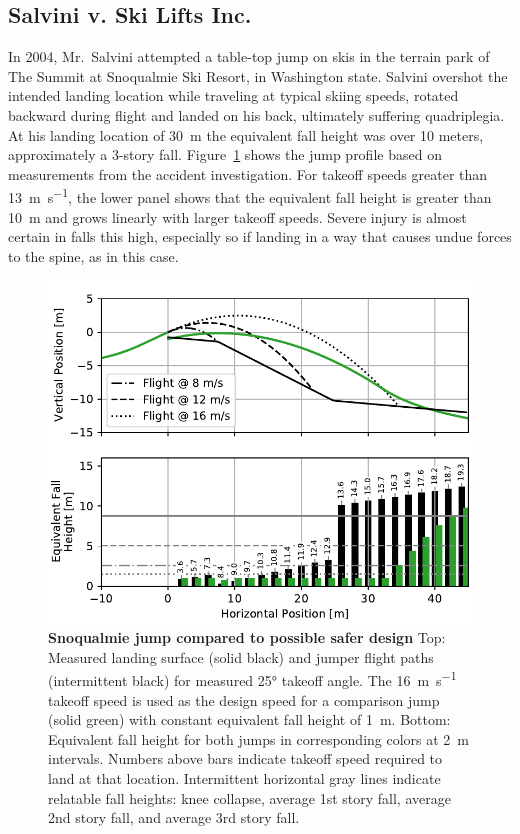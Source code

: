 \documentclass[smallextended]{svjour3}       %
\begin{document}
\subsection{Salvini v. Ski Lifts Inc.}
\label{sec:salvini}
%
In 2004, Mr.~Salvini attempted a table-top jump on skis in the terrain park of
The Summit at Snoqualmie Ski Resort, in Washington state. Salvini overshot the
intended landing location while traveling at typical skiing speeds, rotated
backward during flight and landed on his back, ultimately suffering
quadriplegia. At his landing location of 30~\si{\meter} the equivalent fall
height was over 10 meters, approximately a 3-story fall.
Figure~\ref{fig:salvini-v-snoqualmie} shows the jump profile based on
measurements from the accident investigation.  For takeoff speeds greater than
13~\si{\meter\per\second}, the lower panel shows that the equivalent fall
height is greater than 10~\si{\meter} and grows linearly with larger takeoff
speeds. Severe injury is almost certain in falls this high, especially so if
landing in a way that causes undue forces to the spine, as in this case.
%
\begin{figure}
  \centering
  \includegraphics[width=5.25in]{figures/salvini-v-snoqualmie.pdf}
  \caption{\textbf{Snoqualmie jump compared to possible safer design}
  Top: Measured landing surface (solid black) and jumper flight paths
  (intermittent black) for measured 25\si{\degree} takeoff angle. The
  16~\si{\meter\per\second} takeoff speed is used as the design speed for a
  comparison jump (solid green) with constant equivalent fall height of
  1~\si{\meter}.
  Bottom: Equivalent fall height for both jumps in corresponding colors
  at 2~\si{\meter} intervals. Numbers above bars indicate takeoff speed
  required to land at that location.
  Intermittent horizontal gray lines indicate relatable fall heights: knee
  collapse, average 1st story fall, average 2nd story fall, and average 3rd
  story fall.
  }
  \label{fig:salvini-v-snoqualmie}
\end{figure}
\end{document}
